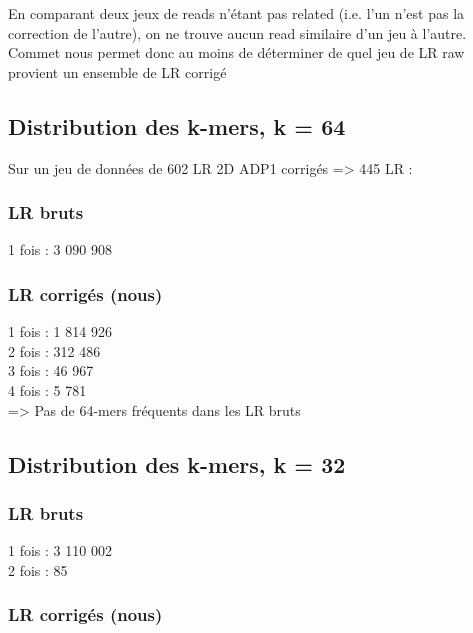 \documentclass[12pt]{article}
\begin{document}
En comparant deux jeux de reads n'étant pas related (i.e. l'un n'est pas la correction de l'autre), on ne trouve aucun read similaire
d'un jeu à l'autre. Commet nous permet donc au moins de déterminer de quel jeu de LR raw provient un ensemble de LR corrigé

\subsection{Distribution des k-mers, k = 64}

Sur un jeu de données de 602 LR 2D ADP1 corrigés => 445 LR :

\subsubsection{LR bruts}

1 fois : 3 090 908 \\

\subsubsection{LR corrigés (nous)}

1 fois : 1 814 926 \\

2 fois : 312 486 \\

3 fois : 46 967 \\

4 fois : 5 781 \\

=> Pas de 64-mers fréquents dans les LR bruts

\subsection{Distribution des k-mers, k = 32}

\subsubsection{LR bruts}

1 fois : 3 110 002 \\

2 fois : 85 \\

\subsubsection{LR corrigés (nous)}
\end{document}
